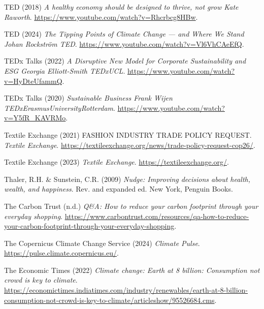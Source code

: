 \documentclass[
  letterpaper,
  DIV=11,
  numbers=noendperiod]{scrartcl}
\newlength{\cslhangindent}
\newenvironment{CSLReferences}[2] %
 {\begin{list}{}{%
  \setlength{\itemindent}{0pt}
  \setlength{\leftmargin}{0pt}
  \setlength{\parsep}{0pt}
  \ifodd #1
   \setlength{\leftmargin}{\cslhangindent}
   \setlength{\itemindent}{-1\cslhangindent}
  \fi
  \setlength{\itemsep}{#2\baselineskip}}}
 {\end{list}}
\begin{document}
\begin{CSLReferences}{0}{1}
TED (2018) \emph{A healthy economy should be designed to thrive, not
grow {\textbar} {Kate Raworth}}.
\url{https://www.youtube.com/watch?v=Rhcrbcg8HBw}.

TED (2024) \emph{The {Tipping Points} of {Climate Change} --- and {Where
We Stand} {\textbar} {Johan Rockstr{ö}m} {\textbar} {TED}}.
\url{https://www.youtube.com/watch?v=Vl6VhCAeEfQ}.

TEDx Talks (2022) \emph{A {Disruptive New Model} for {Corporate
Sustainability} and {ESG} {\textbar} {Georgia Elliott-Smith} {\textbar}
{TEDxUCL}}. \url{https://www.youtube.com/watch?v=HyDteUfammQ}.

TEDx Talks (2020) \emph{Sustainable {Business} {\textbar} {Frank Wijen}
{\textbar} {TEDxErasmusUniversityRotterdam}}.
\url{https://www.youtube.com/watch?v=Y5fR_KAVRMo}.

Textile Exchange (2021) {FASHION INDUSTRY TRADE POLICY REQUEST}.
\emph{Textile Exchange}.
\url{https://textileexchange.org/news/trade-policy-request-cop26/}.

Textile Exchange (2023) \emph{Textile {Exchange}}.
\url{https://textileexchange.org/}.

Thaler, R.H. \& Sunstein, C.R. (2009) \emph{Nudge: Improving decisions
about health, wealth, and happiness}. Rev. and expanded ed. New York,
Penguin Books.

The Carbon Trust (n.d.) \emph{Q\&{A}: {How} to reduce your carbon
footprint through your everyday shopping}.
\url{https://www.carbontrust.com/resources/qa-how-to-reduce-your-carbon-footprint-through-your-everyday-shopping}.

The Copernicus Climate Change Service (2024) \emph{Climate {Pulse}}.
\url{https://pulse.climate.copernicus.eu/}.

The Economic Times (2022) \emph{Climate change: {Earth} at 8 billion:
{Consumption} not crowd is key to climate}.
\url{https://economictimes.indiatimes.com/industry/renewables/earth-at-8-billion-consumption-not-crowd-is-key-to-climate/articleshow/95526684.cms}.


\end{CSLReferences}
\end{document}
